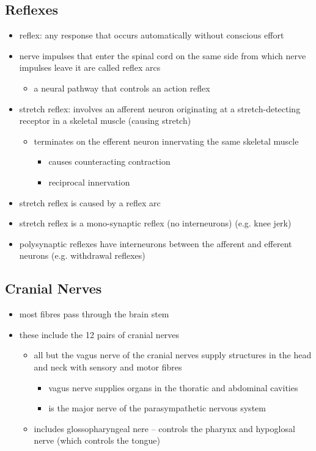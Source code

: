 \documentclass[10pt]{article}
\begin{document}
\subsection{Reflexes}
\begin{itemize}
    \item reflex: any response that occurs automatically without conscious effort
    \item nerve impulses that enter the spinal cord on the same side from which nerve impulses leave it are called reflex arcs
        \begin{itemize}
            \item a neural pathway that controls an action reflex
        \end{itemize}
    \item stretch reflex: involves an afferent neuron originating at a stretch-detecting receptor in a skeletal muscle (causing stretch)
        \begin{itemize}
            \item terminates on the efferent neuron innervating the same skeletal muscle
                \begin{itemize}
                    \item causes counteracting contraction
                    \item reciprocal innervation
                \end{itemize}
        \end{itemize}
    \item stretch reflex is caused by a reflex arc 
    \item stretch reflex is a mono-synaptic reflex (no interneurons) (e.g. knee jerk)
    \item polysynaptic reflexes have interneurons between the afferent and efferent neurons (e.g. withdrawal reflexes)
\end{itemize}


\subsection{Cranial Nerves}
\begin{itemize}
    \item most fibres pass through the brain stem 
    \item these include the 12 pairs of cranial nerves
        \begin{itemize}
            \item all but the vagus nerve of the cranial nerves supply structures in the head and neck with sensory and motor fibres
                \begin{itemize}
                    \item vagus nerve supplies organs in the thoratic and abdominal cavities
                    \item is the major nerve of the parasympathetic nervous system
                \end{itemize}
            \item includes glossopharyngeal nere -- controls the pharynx and hypoglosal nerve (which controls the tongue)
        \end{itemize}
\end{itemize}
\end{document}
